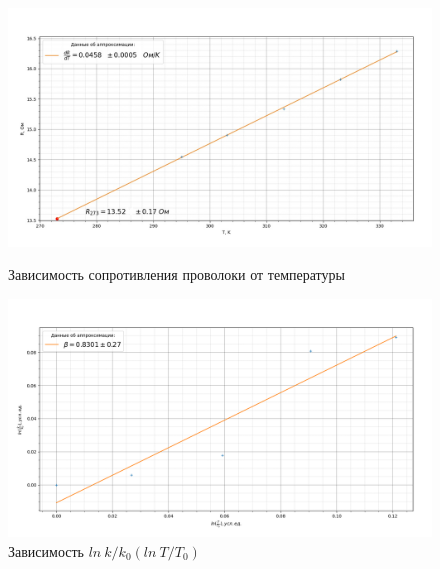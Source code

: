 \documentclass[a4paper, 12pt]{article}%
\begin{document}
	 \begin{figure}[H]
	 	\begin{center}
	 		\begin{minipage}[h]{0.48\linewidth}
	 			\includegraphics[width=1\linewidth]{InkedR_T_LI}
	 			\caption{Зависимость сопротивления проволоки от температуры}
	 		\end{minipage}
	 		\hfill
	 		\begin{minipage}[h]{0.48\linewidth}
	 			\includegraphics[width=1\linewidth]{beta}
	 			\caption{Зависимость $ln~k/k_{0}(ln~T/T_{0})$}
	 			
	 			
	 		\end{minipage}
	 	\end{center}
 	\end{figure}
\end{document}
